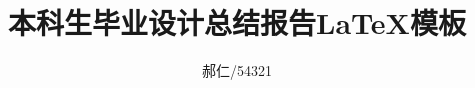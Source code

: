   \title[本科生毕业设计总结报告\LaTeX{}模板]{本科生毕业设计总结报告\LaTeX{}模板}%
  \author{郝仁/54321}%
\maketitle
\tableofcontents


